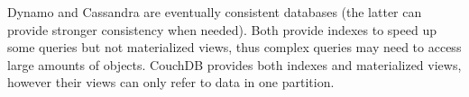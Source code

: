 \documentclass[sigplan,10pt]{acmart}
\begin{document}
Dynamo \cite{dynamo} and Cassandra \cite{cassandra} are eventually consistent databases (the latter can provide stronger consistency when needed).
Both provide indexes to speed up some queries but not materialized views, thus complex queries may need to access large amounts of objects.
CouchDB \cite{couchDB} provides both indexes and materialized views, however their views can only refer to data in one partition.





%
%
\end{document}
